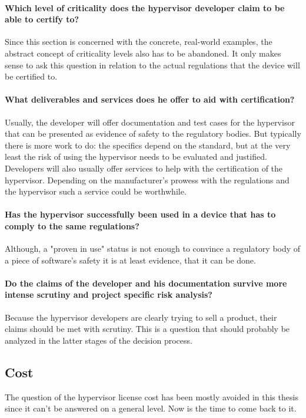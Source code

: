 \paragraph{Which level of criticality does the hypervisor developer claim to be able to certify to?}
Since this section is concerned with the concrete, real-world examples, the abstract concept of criticality levels also has to be abandoned. It only makes sense to ask this question in relation to the actual regulations that the device will be certified to.

\paragraph{What deliverables and services does he offer to aid with certification?}
Usually, the developer will offer documentation and test cases for the hypervisor that can be presented as evidence of safety to the regulatory bodies. But typically there is more work to do: the specifics depend on the standard, but at the very least the risk of using the hypervisor needs to be evaluated and justified. Developers will also usually offer services to help with the certification of the hypervisor. Depending on the manufacturer's prowess with the regulations and the hypervisor such a service could be worthwhile.
\paragraph{Has the hypervisor successfully been used in a device that has to comply to the same regulations?}
Although, a "proven in use" status is not enough to convince a regulatory body of a piece of software's safety it is at least evidence, that it can be done.
\paragraph{Do the claims of the developer and his documentation survive more intense scrutiny and project specific risk analysis?}
Because the hypervisor developers are clearly trying to sell a product, their claims should be met with scrutiny. This is a question that should probably be analyzed in the latter stages of the decision process.
\subsection{Cost}
The question of the hypervisor license cost has been mostly avoided in this thesis since it can't be answered on a general level. Now is the time to come back to it.

